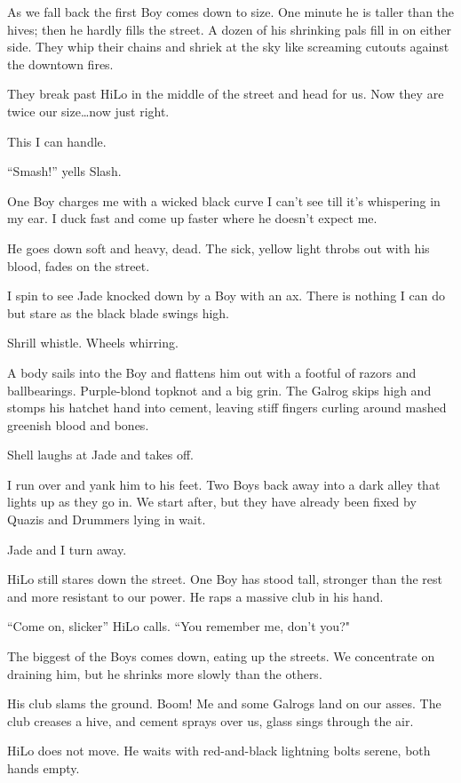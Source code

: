 As we fall back the first Boy comes down to size. One minute he is taller than the hives; then he hardly fills the street. A dozen of his shrinking pals fill in on either side. They whip their chains and shriek at the sky like screaming cutouts against the downtown fires.

They break past HiLo in the middle of the street and head for us. Now they are twice our size\ldots now just right.

This I can handle.

``Smash!'' yells Slash.

One Boy charges me with a wicked black curve I can't see till it's whispering in my ear. I duck fast and come up faster where he doesn't expect me.

He goes down soft and heavy, dead. The sick, yellow light throbs out with his blood, fades on the street.

I spin to see Jade knocked down by a Boy with an ax. There is nothing I can do but stare as the black blade swings high.

Shrill whistle. Wheels whirring.

A body sails into the Boy and flattens him out with a footful of razors and ballbearings. Purple-blond topknot and a big grin. The Galrog skips high and stomps his hatchet hand into cement, leaving stiff fingers curling around mashed greenish blood and bones.

Shell laughs at Jade and takes off.

I run over and yank him to his feet. Two Boys back away into a dark alley that lights up as they go in. We start after, but they have already been fixed by Quazis and Drummers lying in wait.

Jade and I turn away.

HiLo still stares down the street. One Boy has stood tall, stronger than the rest and more resistant to our power. He raps a massive club in his hand.

``Come on, slicker'' HiLo calls. ``You remember me, don't you?"

The biggest of the Boys comes down, eating up the streets. We concentrate on draining him, but he shrinks more slowly than the others.

His club slams the ground. Boom! Me and some Galrogs land on our asses. The club creases a hive, and cement sprays over us, glass sings through the air.

HiLo does not move. He waits with red-and-black lightning bolts serene, both hands empty.


